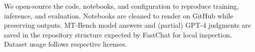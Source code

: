 \documentclass{assignment7_report}
\begin{document}
We open-source the code, notebooks, and configuration to reproduce training, inference, and evaluation. Notebooks are cleaned to render on GitHub while preserving outputs. MT-Bench model answers and (partial) GPT-4 judgments are saved in the repository structure expected by FastChat for local inspection. Dataset usage follows respective licenses.







\end{document}
